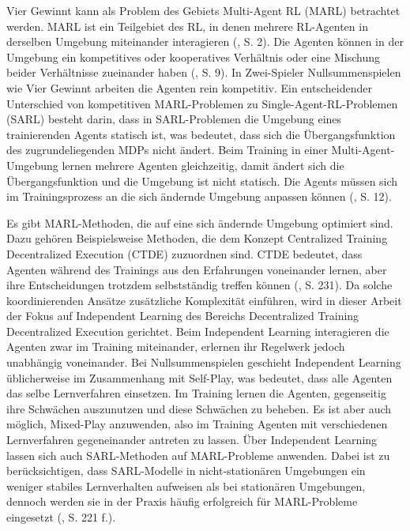 Vier Gewinnt kann als Problem des Gebiets Multi-Agent RL (MARL) betrachtet werden. MARL ist ein Teilgebiet des RL, in denen mehrere RL-Agenten in derselben Umgebung miteinander interagieren (\cite{Albrecht.2024}, S. 2). Die Agenten können in der Umgebung ein kompetitives oder kooperatives Verhältnis oder eine Mischung beider Verhältnisse zueinander haben (\cite{Albrecht.2024}, S. 9). In Zwei-Spieler Nullsummenspielen wie Vier Gewinnt arbeiten die Agenten rein kompetitiv. Ein entscheidender Unterschied von kompetitiven MARL-Problemen zu Single-Agent-RL-Problemen (SARL) besteht darin, dass in SARL-Problemen die Umgebung eines trainierenden Agents statisch ist, was bedeutet, dass sich die Übergangsfunktion des zugrundeliegenden MDPs nicht ändert. Beim Training in einer Multi-Agent-Umgebung lernen mehrere Agenten gleichzeitig, damit ändert sich die Übergangsfunktion und die Umgebung ist nicht statisch. Die Agents müssen sich im Trainingsprozess an die sich ändernde Umgebung anpassen können (\cite{Albrecht.2024}, S. 12).

Es gibt MARL-Methoden, die auf eine sich ändernde Umgebung optimiert sind. Dazu gehören Beispielsweise Methoden, die dem Konzept \glqq Centralized Training Decentralized Execution\grqq{} (CTDE) zuzuordnen sind. CTDE bedeutet, dass Agenten während des Trainings aus den Erfahrungen voneinander lernen, aber ihre Entscheidungen trotzdem selbstständig treffen können (\cite{Albrecht.2024}, S. 231). Da solche koordinierenden Ansätze zusätzliche Komplexität einführen, wird in dieser Arbeit der Fokus auf Independent Learning des Bereichs \glqq Decentralized Training Decentralized Execution\grqq{} gerichtet. Beim Independent Learning interagieren die Agenten zwar im Training miteinander, erlernen ihr Regelwerk jedoch unabhängig voneinander. Bei Nullsummenspielen geschieht Independent Learning üblicherweise im Zusammenhang mit Self-Play, was bedeutet, dass alle Agenten das selbe Lernverfahren einsetzen. Im Training lernen die Agenten, gegenseitig ihre Schwächen auszunutzen und diese Schwächen zu beheben. Es ist aber auch möglich, Mixed-Play anzuwenden, also im Training Agenten mit verschiedenen Lernverfahren gegeneinander antreten zu lassen. Über Independent Learning lassen sich auch SARL-Methoden auf MARL-Probleme anwenden. Dabei ist zu berücksichtigen, dass SARL-Modelle in nicht-stationären Umgebungen ein weniger stabiles Lernverhalten aufweisen als bei stationären Umgebungen, dennoch werden sie in der Praxis häufig erfolgreich für MARL-Probleme eingesetzt (\cite{Albrecht.2024}, S. 221 f.).

